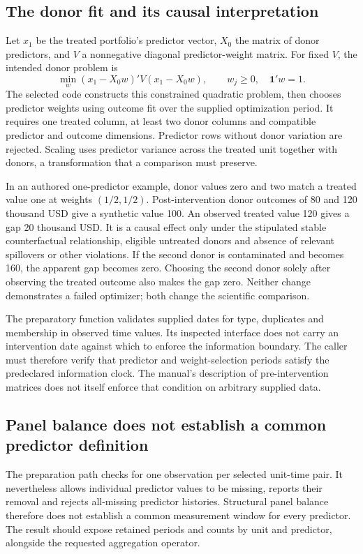 \subsection{The donor fit and its causal interpretation}
Let $x_1$ be the treated portfolio's predictor vector, $X_0$ the matrix of
donor predictors, and $V$ a nonnegative diagonal predictor-weight matrix.
For fixed $V$, the intended donor problem is
\[
 \min_w (x_1-X_0w)'V(x_1-X_0w),
 \qquad w_j\geq0,\quad \mathbf{1}'w=1.
\]
The selected code constructs this constrained quadratic problem, then
chooses predictor weights using outcome fit over the supplied optimization
period. It requires one treated column, at least two donor columns and
compatible predictor and outcome dimensions. Predictor rows without donor
variation are rejected. Scaling uses predictor variance across the treated
unit together with donors, a transformation that a comparison must preserve.
\citep{exec24_synth_source,v12_sw_synth}

In an authored one-predictor example, donor values zero and two match a
treated value one at weights $(1/2,1/2)$. Post-intervention donor outcomes
of 80 and 120 thousand USD give a synthetic value 100. An observed treated
value 120 gives a gap 20 thousand USD. It is a causal effect only under
the stipulated stable counterfactual relationship, eligible untreated
donors and absence of relevant spillovers or other violations. If the
second donor is contaminated and becomes 160, the apparent gap becomes
zero. Choosing the second donor solely after observing the treated outcome
also makes the gap zero. Neither change demonstrates a failed optimizer;
both change the scientific comparison.
\citep{exec24_synth_choice}

The preparatory function validates supplied dates for type, duplicates
and membership in observed time values. Its inspected interface does not
carry an intervention date against which to enforce the information
boundary. The caller must therefore verify that predictor and
weight-selection periods satisfy the predeclared information clock.
The manual's description of pre-intervention matrices does not itself
enforce that condition on arbitrary supplied data.
\citep{exec24_synth_source,v12_sw_synth}

\subsection{Panel balance does not establish a common predictor definition}
The preparation path checks for one observation per selected unit-time
pair. It nevertheless allows individual predictor values to be missing,
reports their removal and rejects all-missing predictor histories.
Structural panel balance therefore does not establish a common measurement
window for every predictor. The result should expose retained periods and
counts by unit and predictor, alongside the requested aggregation operator.
\citep{exec24_synth_source}

